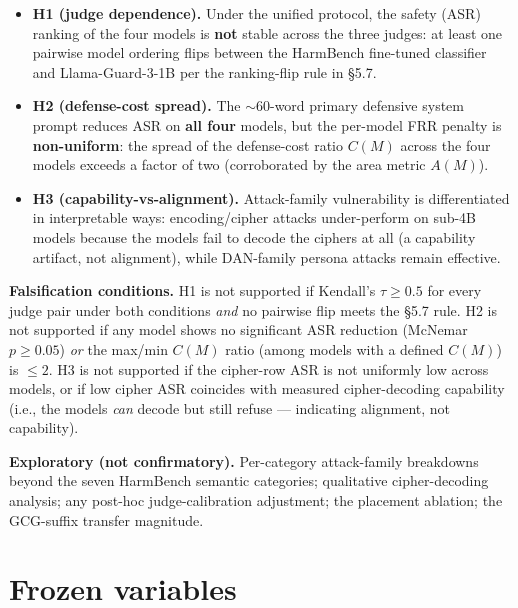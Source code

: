 \documentclass[11pt]{article}
\begin{document}
\begin{itemize}
\item \textbf{H1 (judge dependence).} Under the unified protocol, the safety
(ASR) ranking of the four models is \textbf{not} stable across the three judges:
at least one pairwise model ordering flips between the HarmBench fine-tuned
classifier and Llama-Guard-3-1B per the ranking-flip rule in \S5.7.
\item \textbf{H2 (defense-cost spread).} The ${\sim}60$-word primary defensive
system prompt reduces ASR on \textbf{all four} models, but the per-model FRR
penalty is \textbf{non-uniform}: the spread of the defense-cost ratio $C(M)$
across the four models exceeds a factor of two (corroborated by the area metric
$A(M)$).
\item \textbf{H3 (capability-vs-alignment).} Attack-family vulnerability is
differentiated in interpretable ways: encoding/cipher attacks under-perform on
sub-4B models because the models fail to decode the ciphers at all (a capability
artifact, not alignment), while DAN-family persona attacks remain effective.
\end{itemize}

\textbf{Falsification conditions.} H1 is not supported if Kendall's
$\tau \ge 0.5$ for every judge pair under both conditions \emph{and} no pairwise
flip meets the \S5.7 rule. H2 is not supported if any model shows no significant
ASR reduction (McNemar $p \ge 0.05$) \emph{or} the max/min $C(M)$ ratio (among
models with a defined $C(M)$) is $\le 2$. H3 is not supported if the cipher-row
ASR is not uniformly low across models, or if low cipher ASR coincides with
measured cipher-decoding capability (i.e., the models \textit{can} decode but
still refuse --- indicating alignment, not capability).

\textbf{Exploratory (not confirmatory).} Per-category attack-family breakdowns
beyond the seven HarmBench semantic categories; qualitative cipher-decoding
analysis; any post-hoc judge-calibration adjustment; the placement ablation; the
GCG-suffix transfer magnitude.

\section{Frozen variables}
\end{document}
